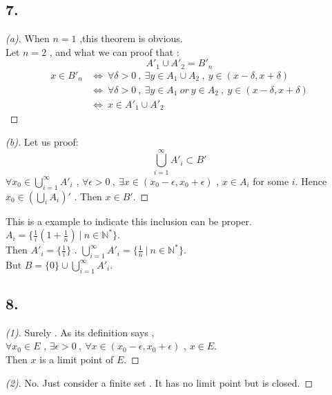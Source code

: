 \documentclass{report}
\begin{document}
            \subsection*{7.}
                \begin{proof}[(a)]
                    When $n=1$ ,this theorem is obvious.\\
                    Let $n=2$ , and what we can proof that :
                    \[A'_1 \cup A'_2 = B'_n\]
                    \begin{align*}
                        x \in B'_n &\Longleftrightarrow \  \forall \delta > 0\ ,\ \exists y \in A_1\cup A_2 \ , \ y \in (x-\delta,x+\delta)\\
                                   &\Longleftrightarrow \  \forall \delta > 0\ ,\ \exists y \in A_1 \ or \ y \in  A_2 \ , \ y \in (x-\delta,x+\delta)\\
                                   &\Longleftrightarrow \  x \in A'_1 \cup A'_2
                    \end{align*}
                \end{proof}
                \begin{proof}[(b)]
                    Let us proof:
                    \[\bigcup_{i=1}^\infty A'_i \subset B'\]
                    $\forall x_0 \in \bigcup_{i=1}^\infty A'_i $ ,
                     $\forall \epsilon > 0 \ , \ \exists x \in (x_0-\epsilon,x_0+\epsilon)$ , $x \in A_i$ for some $i$.
                     Hence $x_0 \in (\bigcup_{i} A_i)'$ .
                     Then $x \in B'$.
                \end{proof}
                This is a example to indicate this inclusion can be proper.\\
                $A_i=\{\frac{1}{i} (1+\frac{1}{n}) \ | \ n \in \mathbb{N^*} \}$.\\
                \newline
                Then $A'_i=\{\frac{1}{i}\}$ . $\bigcup_{i=1}^\infty A'_i=\{\frac{1}{n} \ | \ n \in \mathbb{N^*} \}$.\\
                \newline
                But $B=\{0\} \cup \bigcup_{i=1}^\infty A'_i$.
            \subsection*{8.}
                \begin{proof}[(1)]
                    Surely . As its definition says , \\
                    $\forall x_0 \in E $ ,
                     $\exists \epsilon > 0 \ , \ \forall x \in (x_0-\epsilon,x_0+\epsilon)$ , $x \in E$.\\
                     Then $x$ is a limit point of $E$.
                \end{proof}
                \begin{proof}[(2)]
                    No. Just consider a finite set . It has no limit point but is closed.
                \end{proof}
\end{document}
